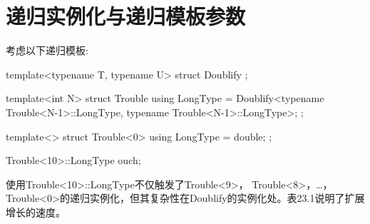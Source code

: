 \section{递归实例化与递归模板参数}
考虑以下递归模板:

\begin{cpp}
template<typename T, typename U>
struct Doublify {
};

template<int N>
struct Trouble {
	using LongType = Doublify<typename Trouble<N-1>::LongType,
	typename Trouble<N-1>::LongType>;
};

template<>
struct Trouble<0> {
	using LongType = double;
};

Trouble<10>::LongType ouch;
\end{cpp}

使用Trouble<10>::LongType不仅触发了Trouble<9>， Trouble<8>，…，Trouble<0>的递归实例化，但其复杂性在Doublify的实例化处。表23.1说明了扩展增长的速度。

